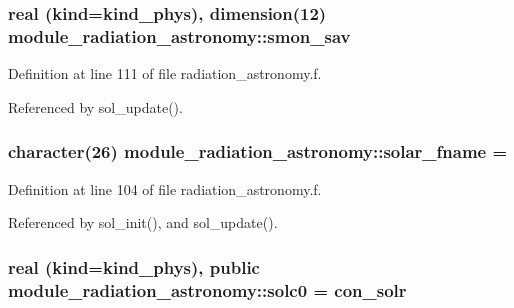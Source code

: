 \subsubsection[{\texorpdfstring{smon\+\_\+sav}{smon_sav}}]{\setlength{\rightskip}{0pt plus 5cm}real (kind=kind\+\_\+phys), dimension(12) module\+\_\+radiation\+\_\+astronomy\+::smon\+\_\+sav\hspace{0.3cm}{\ttfamily [private]}}\hypertarget{namespacemodule__radiation__astronomy_ab68b4488022a4c6340cb60dca3feff6a}{}\label{namespacemodule__radiation__astronomy_ab68b4488022a4c6340cb60dca3feff6a}


Definition at line 111 of file radiation\+\_\+astronomy.\+f.



Referenced by sol\+\_\+update().

\subsubsection[{\texorpdfstring{solar\+\_\+fname}{solar_fname}}]{\setlength{\rightskip}{0pt plus 5cm}character(26) module\+\_\+radiation\+\_\+astronomy\+::solar\+\_\+fname = \textquotesingle{} \textquotesingle{}\hspace{0.3cm}{\ttfamily [private]}}\hypertarget{namespacemodule__radiation__astronomy_a05ee7e378d38b90242738b9bf6c40c00}{}\label{namespacemodule__radiation__astronomy_a05ee7e378d38b90242738b9bf6c40c00}


Definition at line 104 of file radiation\+\_\+astronomy.\+f.



Referenced by sol\+\_\+init(), and sol\+\_\+update().

\subsubsection[{\texorpdfstring{solc0}{solc0}}]{\setlength{\rightskip}{0pt plus 5cm}real (kind=kind\+\_\+phys), public module\+\_\+radiation\+\_\+astronomy\+::solc0 = con\+\_\+solr}\hypertarget{namespacemodule__radiation__astronomy_a37e08872f67023b11f839ac15151af09}{}\label{namespacemodule__radiation__astronomy_a37e08872f67023b11f839ac15151af09}



